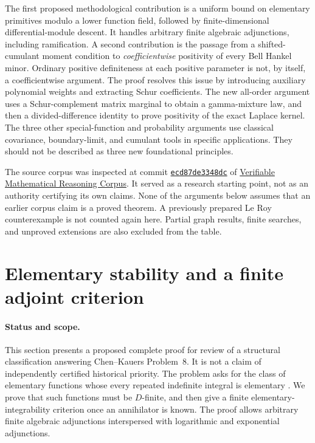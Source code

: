 \documentclass[11pt,a4paper]{article}
\theoremstyle{definition}
\theoremstyle{remark}
\numberwithin{equation}{section}
\begin{document}
The first proposed methodological contribution is a uniform bound on
elementary primitives modulo a lower function field, followed by
finite-dimensional differential-module descent. It handles arbitrary finite
algebraic adjunctions, including ramification. A second contribution is the passage
from a shifted-cumulant moment condition to \emph{coefficientwise} positivity
of every Bell Hankel minor. Ordinary positive definiteness at each positive
parameter is not, by itself, a coefficientwise argument. The proof resolves
this issue by introducing auxiliary polynomial weights and extracting Schur
coefficients. The new all-order argument uses a Schur-complement matrix marginal
to obtain a gamma-mixture law, and then a divided-difference identity
to prove positivity of the exact Laplace kernel.
The three other special-function and probability arguments use classical covariance,
boundary-limit, and cumulant tools in specific applications. They should
not be described as three new foundational principles.

The source corpus was inspected at commit
\href{https://github.com/QEEDDD/Verifiable-Mathematical-Reasoning-Corpus/commit/ecd87de3348dcb706a76bb12fde722d7a348a012}{\texttt{ecd87de3348dc}}
of \href{https://github.com/QEEDDD/Verifiable-Mathematical-Reasoning-Corpus}{Verifiable Mathematical Reasoning Corpus}.
It served as a research starting point, not as an authority certifying its
own claims. None of the arguments below assumes that an earlier corpus
claim is a proved theorem. A previously prepared Le Roy counterexample is
not counted again here. Partial graph results, finite searches, and
unproved extensions are also excluded from the table.

\tableofcontents
\bigskip


\section{Elementary stability and a finite adjoint criterion}
\label{stab:section}

\paragraph{Status and scope.}
This section presents a proposed complete proof for review of a structural
classification answering Chen--Kauers Problem~8.  It is not a claim of
independently certified historical priority.  The problem asks for the class
of elementary functions whose every repeated indefinite integral is
elementary \cite[Problem~8]{stab:CK}.  We prove that such functions must be
$D$-finite, and then give a finite elementary-integrability criterion once
an annihilator is known.  The proof allows arbitrary finite algebraic
adjunctions interspersed with logarithmic and exponential adjunctions.
\end{document}
